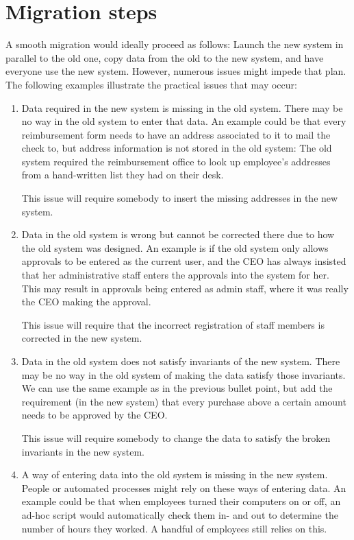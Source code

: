 \documentclass{elsarticle}
\begin{document}
\section{Migration steps}
   A smooth migration would ideally proceed as follows:
   Launch the new system in parallel to the old one, copy data from the old to the new system, and have everyone use the new system.
   However, numerous issues might impede that plan.
   The following examples illustrate the practical issues that may occur:
\begin{enumerate}
\item Data required in the new system is missing in the old system.
   There may be no way in the old system to enter that data.
   An example could be that every reimbursement form needs to have an address associated to it to mail the check to, but address information is not stored in the old system:
   The old system required the reimbursement office to look up employee's addresses from a hand-written list they had on their desk.

   This issue will require somebody to insert the missing addresses in the new system.
\item Data in the old system is wrong but cannot be corrected there due to how the old system was designed.
   An example is if the old system only allows approvals to be entered as the current user, and the CEO has always insisted that her administrative staff enters the approvals into the system for her.
   This may result in approvals being entered as admin staff, where it was really the CEO making the approval.

   This issue will require that the incorrect registration of staff members is corrected in the new system.
\item Data in the old system does not satisfy invariants of the new system.
   There may be no way in the old system of making the data satisfy those invariants.
   We can use the same example as in the previous bullet point,
   but add the requirement (in the new system) that every purchase above a certain amount needs to be approved by the CEO.

   This issue will require somebody to change the data to satisfy the broken invariants in the new system.
\item A way of entering data into the old system is missing in the new system.
   People or automated processes might rely on these ways of entering data.
   An example could be that when employees turned their computers on or off,
   an ad-hoc script would automatically check them in- and out to determine the number of hours they worked.
   A handful of employees still relies on this.


\end{enumerate}
\end{document}
